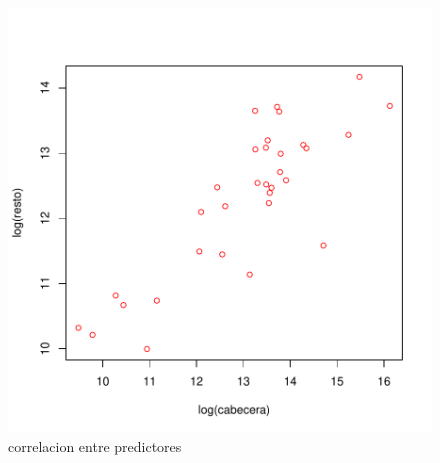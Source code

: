 \begin{figure}[h]
\centering
\includegraphics{correlacion-corrPlotX}
\caption{correlacion entre predictores}
\label{corrPlot}
\end{figure}
\endinput
